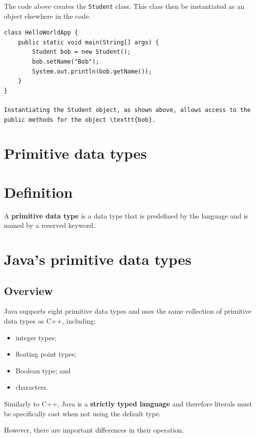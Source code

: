 \documentclass[a4paper]{systems-software}
\begin{document}
The code above creates the \texttt{Student} class. This class then be instantiated as an object elsewhere in the code.

\begin{lstlisting}[title={Instantiation of a Student object.}]
class HelloWorldApp {
	public static void main(String[] args) {
		Student bob = new Student();
		bob.setName("Bob");
		System.out.println(bob.getName());
	}
}

Instantiating the Student object, as shown above, allows access to the public methods for the object \texttt{bob}.

\end{lstlisting}


\section{Primitive data types}

\section*{Definition}

A \textbf{primitive data type} is a data type that is predefined by the language and is named by a reserved keyword.


\section*{Java's primitive data types}

\subsection*{Overview}

Java supports eight primitive data types and uses the same collection of primitive data types as C++, including:
\begin{itemize}
	\item integer types;
	\item floating point types;
	\item Boolean type; and
	\item characters.
\end{itemize}

Similarly to C++, Java is a \textbf{strictly typed language} and therefore literals must be specifically cast when not using the default type.

However, there are important differences in their operation.
\end{document}
